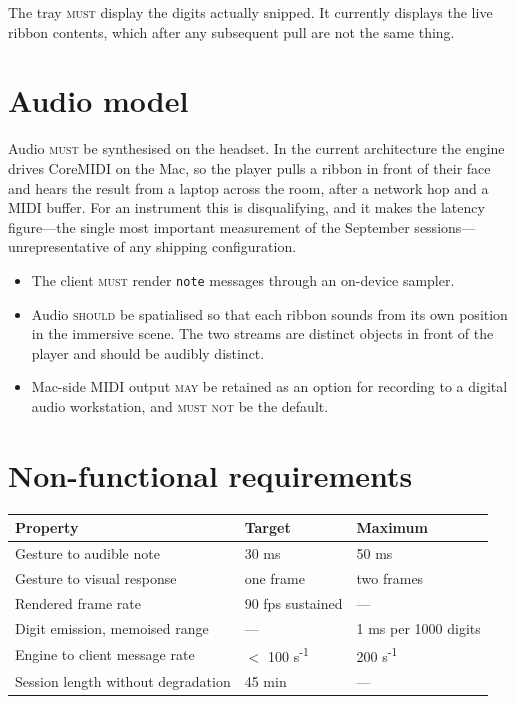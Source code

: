 \documentclass[11pt,a4paper]{article}
\newcommand{\MUST}{\textsc{must}}
\newcommand{\MUSTNOT}{\textsc{must not}}
\newcommand{\SHOULD}{\textsc{should}}
\newcommand{\MAY}{\textsc{may}}
\theoremstyle{definition}
\theoremstyle{plain}
\theoremstyle{remark}
\begin{document}
The tray \MUST{} display the digits actually snipped. It currently displays the live ribbon
contents, which after any subsequent pull are not the same thing.

\section{Audio model}

Audio \MUST{} be synthesised on the headset. In the current architecture the engine drives CoreMIDI
on the Mac, so the player pulls a ribbon in front of their face and hears the result from a laptop
across the room, after a network hop and a MIDI buffer. For an instrument this is disqualifying, and
it makes the latency figure---the single most important measurement of the September sessions---
unrepresentative of any shipping configuration.

\begin{itemize}[leftmargin=*]
\item The client \MUST{} render \texttt{note} messages through an on-device sampler.
\item Audio \SHOULD{} be spatialised so that each ribbon sounds from its own position in the
      immersive scene. The two streams are distinct objects in front of the player and should be
      audibly distinct.
\item Mac-side MIDI output \MAY{} be retained as an option for recording to a digital audio
      workstation, and \MUSTNOT{} be the default.
\end{itemize}

\section{Non-functional requirements}

\begin{center}
\begin{tabular}{lll}
\toprule
\textbf{Property} & \textbf{Target} & \textbf{Maximum} \\
\midrule
Gesture to audible note & 30 ms & 50 ms \\
Gesture to visual response & one frame & two frames \\
Rendered frame rate & 90 fps sustained & --- \\
Digit emission, memoised range & --- & 1 ms per 1000 digits \\
Engine to client message rate & $<$ 100 s\textsuperscript{-1} & 200 s\textsuperscript{-1} \\
Session length without degradation & 45 min & --- \\
\bottomrule
\end{tabular}
\end{center}
\end{document}

